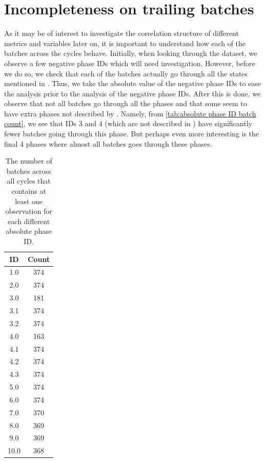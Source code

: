 \documentclass[../Thesis.tex]{subfiles}
\begin{document}
\section{Incompleteness on trailing batches}
As it may be of interest to investigate the correlation structure of different metrics and variables later on, it is important to understand how each of the batches across the cycles behave. Initially, when looking through the dataset, we observe a few negative phase IDs which will need investigation. However, before we do so, we check that each of the batches actually go through all the states mentioned in \cite{benchmark-model-to-generate-batch-process-data}. Thus, we take the absolute value of the negative phase IDs to ease the analysis prior to the analysis of the negative phase IDs. After this is done, we observe that not all batches go through all the phases and that some seem to have extra phases not described by \cite{benchmark-model-to-generate-batch-process-data}. Namely, from \autoref{tab:absolute phase ID batch count}, we see that IDs 3 and 4 (which are not described in \cite{benchmark-model-to-generate-batch-process-data}) have significantly fewer batches going through this phase. But perhaps even more interesting is the final 4 phases where almost all batches goes through these phases.

\begin{table}[h]
    \centering
    \begin{tabular}{c|c}
        ID & Count \\\hline
        1.0 & 374\\
        2.0 & 374\\
        3.0 & 181\\
        3.1 & 374\\
        3.2 & 374\\
        4.0 & 163\\
        4.1 & 374\\
        4.2 & 374\\
        4.3 & 374\\
        5.0 & 374\\
        6.0 & 374\\
        7.0 & 370\\
        8.0 & 369\\
        9.0 & 369\\
        10.0 & 368
    \end{tabular}
    \caption{The number of batches across all cycles that contains at least one observation for each different absolute phase ID.}
    \label{tab:absolute phase ID batch count}
\end{table}
\end{document}
